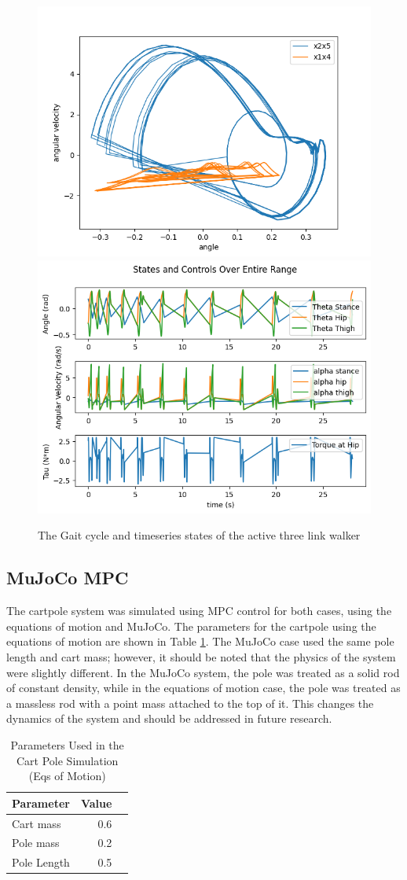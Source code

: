 \documentclass{./springer/svjour3}
\begin{document}
\begin{figure}[!h]
  \centering
  \includegraphics[width=.4\linewidth]{./figures/three_gait.png} %
  \includegraphics[width=.4\linewidth]{./figures/timeseries_data.png}
  \caption{The Gait cycle and timeseries states of the active three link walker}
  \label{fig:active_sol}
\end{figure}

\subsection{MuJoCo MPC}
The cartpole system was simulated using MPC control for both cases, using the equations of motion and MuJoCo. The parameters for the cartpole using the equations of motion are shown 
in Table \ref{tab:cartpole_params}. The MuJoCo case used the same pole length and cart mass; however, it should be noted that the physics of the system were slightly different.
In the MuJoCo system, the pole was treated as a solid rod of constant density, while in the equations of motion case, the pole was treated as a massless rod 
with a point mass attached to the top of it. This changes the dynamics of the system and should be addressed in future research.

\begin{table}[h]
  \centering
  \caption{Parameters Used in the Cart Pole Simulation (Eqs of Motion)}
  \begin{tabular}{lrr}
  \toprule
  Parameter & Value\\
  \midrule
  Cart mass & 0.6 \\
  Pole mass & 0.2\\
  Pole Length & 0.5\\
  \end{tabular}
  \label{tab:cartpole_params}
\end{table}
\end{document}
